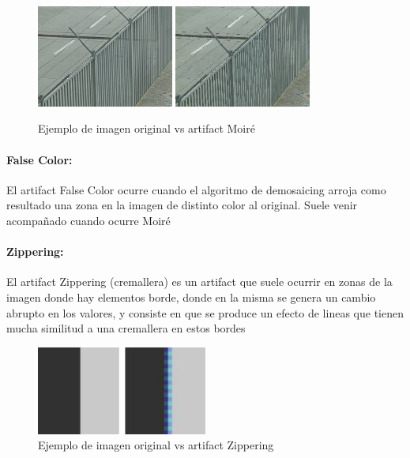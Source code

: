 \begin{figure}[htb]
\begin{center}
       \includegraphics[width=0.4\textwidth]{imagenes/moire_original.jpg}
          \hfill
           \includegraphics[width=0.4\textwidth]{imagenes/moire_example.jpg}
          
       Ejemplo de imagen original vs artifact Moiré
       \end{center}

\end{figure}

\paragraph{False Color:}
El artifact False Color ocurre cuando el algoritmo de demosaicing arroja como resultado una zona en la imagen de distinto color al original. Suele venir acompañado cuando ocurre Moiré

\paragraph{Zippering:}
El artifact Zippering (cremallera) es un artifact que suele ocurrir en zonas de la imagen donde hay elementos borde, donde en la misma se genera un cambio abrupto en los valores, y consiste en que se produce un efecto de lineas que tienen mucha similitud a una cremallera en estos bordes

\begin{figure}[htb]
\begin{center}
       \includegraphics[width=0.5\textwidth]{imagenes/zippering_example.jpeg}
       \caption{Ejemplo de imagen original vs artifact Zippering}
       \end{center}

\end{figure}
